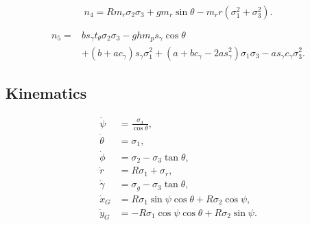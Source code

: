 \documentclass[10pt]{article}
\numberwithin{equation}{section}
\begin{document}
\begin{equation}n_4=Rm_r\sigma_2\sigma_3+gm_r\sin\theta-m_rr(\sigma_1^2+\sigma_3^2).\end{equation}

\begin{equation}
\begin{aligned}
n_5={}&bs_\gamma t_\theta\sigma_2\sigma_3-ghm_ps_\gamma\cos\theta\\
&+(b+ac_\gamma)s_\gamma\sigma_1^2
 +(a+bc_\gamma-2as_\gamma^2)\sigma_1\sigma_3
 -as_\gamma c_\gamma\sigma_3^2.
\end{aligned}
\end{equation}
\subsection*{Kinematics}
\begin{equation}
\boxed{
\begin{aligned}
\dot\psi&=\frac{\sigma_3}{\cos\theta},\\
\dot\theta&=\sigma_1,\\
\dot\phi&=\sigma_2-\sigma_3\tan\theta,\\
\dot r&=R\sigma_1+\sigma_r,\\
\dot\gamma&=\sigma_g-\sigma_3\tan\theta,\\
\dot x_G&=R\sigma_1\sin\psi\cos\theta+R\sigma_2\cos\psi,\\
\dot y_G&=-R\sigma_1\cos\psi\cos\theta+R\sigma_2\sin\psi.
\end{aligned}}
\end{equation}
\end{document}
